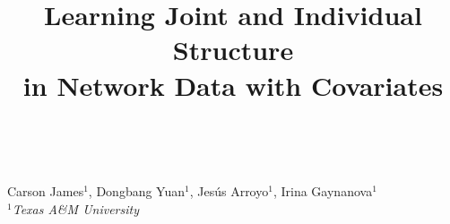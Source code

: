 \documentclass[a0,landscape]{a0poster}
\title{Learning Joint and Individual Structure \\in Network Data with Covariates
	
}
\begin{document}
		
\hspace{-1cm}								%
\colorbox{JHUblue}{

	\hspace{1cm}
	\begin{minipage}[c]{0.75\linewidth}
	\vspace{-2cm}
	\maketitle
	\vspace{-2cm}
	\end{minipage}
	\begin{minipage}[c]{0.3\linewidth}
		\vspace{-1cm}
		\vspace{-1cm}
	\end{minipage}
}
\\%

\vspace{-0.1cm}

\hspace{-1cm}\colorbox{JHUGray}{\hspace{1cm}\begin{minipage}{1189mm}					%
{\vspace{0cm}
\color{white}\sffamily\huge		%
Carson James$^{1}$, Dongbang Yuan$^{1}$, Jes\'us Arroyo$^{1}$, Irina Gaynanova$^{1}$\\
\textit{$^{1}$Texas A\&M University}}
\end{minipage}}
\end{document}
